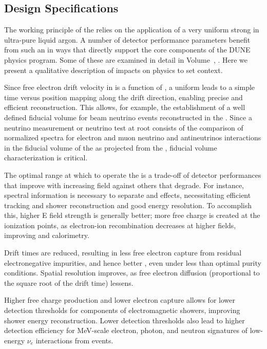 \subsection{Design Specifications}
\label{sec:fdsp-hv-des-consid}

The working principle of the  relies on the application of a very uniform strong \efield in ultra-pure liquid argon.  A number of detector performance parameters benefit from such an \efield in ways that directly support the core components of the DUNE physics program.  Some of these are examined in detail in Volume~\volnumberphysics{}, \voltitlephysics{}.  Here we present a qualitative description of \efield impacts on physics to set context.

Since free electron drift velocity in  is a function of \efield, a uniform \efield leads to a simple time versus position mapping along the drift direction, enabling precise and efficient \threed reconstruction.  This allows, for example, the establishment of a well defined fiducial volume for beam neutrino events reconstructed in the .  Since a neutrino  measurement or neutrino  test at root consists of the comparison of normalized spectra for electron and muon neutrino and antineutrinos interactions in the fiducial volume of the  as projected from the , fiducial volume characterization is critical.   

The optimal \efield range at which to operate the  is a trade-off  of detector performances that improve with increasing field against others that degrade. For instance, spectral information is necessary to separate  and  effects, necessitating efficient tracking and shower reconstruction and good energy resolution. To accomplish this, higher E field strength is generally better; more free charge is created at the ionization points, as electron-ion recombination decreases at higher fields, improving  and calorimetry. 


Drift times are reduced, resulting in less free electron capture from residual electronegative impurities, and hence better , even under less than optimal purity conditions.  Spatial resolution improves, as free electron diffusion (proportional to the square root of the drift time) lessens. 

Higher free charge production and lower electron capture allows for lower detection thresholds for components of electromagnetic showers, improving shower energy reconstruction. Lower detection thresholds also lead to higher detection efficiency for MeV-scale electron, photon, and neutron signatures of low-energy $\nu_e$ interactions from  events.  

